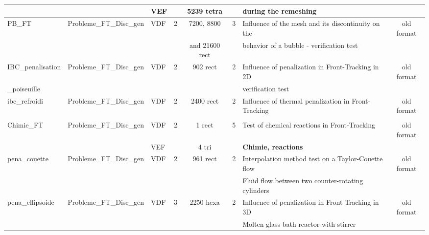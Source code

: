 \begin{table}[H]
\begin{centering}
\begin{tabular}{lclccclc}
\rowcolor{Orchid!10} & & VEF & & 5239 tetra & & during the remeshing & \\ \hline
\rowcolor{Orchid!10}PB\_FT & Probleme\_FT\_Disc\_gen & VDF & 2 & 7200, 8800 & 3 & Influence of the mesh and its discontinuity on the  & old format \\ 
\rowcolor{Orchid!10} & & & & and 21600 rect & & behavior of a bubble - verification test & \\ \hline
\rowcolor{Orchid!10}IBC\_penalisation & Probleme\_FT\_Disc\_gen & VDF & 2 & 902 rect & 2 & Influence of penalization in Front-Tracking in 2D & old format \\ 
\rowcolor{Orchid!10}\_poiseuille & & & & & & verification test & \\ \hline
\rowcolor{Orchid!10}ibc\_refroidi & Probleme\_FT\_Disc\_gen & VDF & 2 & 2400 rect & 2 & Influence of thermal penalization in Front-Tracking & old format \\ 
\rowcolor{Orchid!10} & & & & & & &  \\ \hline
\rowcolor{Orchid!10}Chimie\_FT & Probleme\_FT\_Disc\_gen & VDF & 2 & 1 rect & 5 & Test of chemical reactions in Front-Tracking & old format \\ 
\rowcolor{Orchid!10} & & VEF & & 4 tri & & \textbf{Chimie, reactions} & \\ \hline
\rowcolor{Orchid!10}pena\_couette & Probleme\_FT\_Disc\_gen & VDF & 2 & 961 rect & 2 & Interpolation method test on a Taylor-Couette flow & old format \\ 
\rowcolor{Orchid!10} & & & & & & Fluid flow between two counter-rotating cylinders & \\ \hline
\rowcolor{Orchid!10}pena\_ellipsoide & Probleme\_FT\_Disc\_gen & VDF & 3 & 2250 hexa & 2 & Influence of penalization in Front-Tracking in 3D & old format \\ 
\rowcolor{Orchid!10} & & & & & & Molten glass bath reactor with stirrer & \\ \hline
	\end{tabular}
\end{centering}
\end{table}

\newpage

